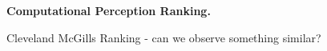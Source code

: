 \textbf{Computational Perception Ranking.}

Cleveland McGills Ranking - can we observe something similar?


